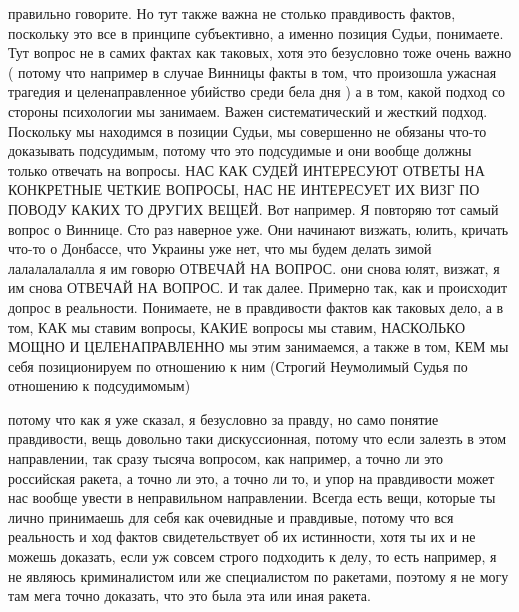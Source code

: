 правильно говорите. Но тут также важна не столько правдивость фактов, поскольку
это все в принципе субъективно, а именно позиция Судьи, понимаете. Тут вопрос
не в самих фактах как таковых, хотя это безусловно тоже очень важно ( потому
что например в случае Винницы факты в том, что произошла ужасная трагедия и
целенаправленное убийство среди бела дня ) а в том, какой подход со стороны
психологии мы занимаем. Важен систематический и жесткий подход. Поскольку мы
находимся в позиции Судьи, мы совершенно не обязаны что-то доказывать
подсудимым, потому что это подсудимые и они вообще должны только отвечать на
вопросы. НАС КАК СУДЕЙ ИНТЕРЕСУЮТ ОТВЕТЫ НА КОНКРЕТНЫЕ ЧЕТКИЕ ВОПРОСЫ, НАС НЕ
ИНТЕРЕСУЕТ ИХ ВИЗГ ПО ПОВОДУ КАКИХ ТО ДРУГИХ ВЕЩЕЙ. Вот например. Я повторяю
тот самый вопрос о Виннице. Сто раз наверное уже. Они начинают визжать, юлить,
кричать что-то о Донбассе, что Украины уже нет, что мы будем делать зимой
лалалалалалла я им говорю ОТВЕЧАЙ НА ВОПРОС. они снова юлят, визжат, я им снова
ОТВЕЧАЙ НА ВОПРОС. И так далее. Примерно так, как и происходит допрос в
реальности. Понимаете, не в правдивости фактов как таковых дело, а в том, КАК
мы ставим вопросы, КАКИЕ вопросы мы ставим, НАСКОЛЬКО МОЩНО И ЦЕЛЕНАПРАВЛЕННО
мы этим занимаемся, а также в том, КЕМ мы себя позиционируем по отношению к ним
(Строгий Неумолимый Судья по отношению к подсудимомым)

потому что как я уже сказал, я безусловно за правду, но само понятие
правдивости, вещь довольно таки дискуссионная, потому что если залезть в этом
направлении, так сразу тысяча вопросом, как например, а точно ли это российская
ракета, а точно ли это, а точно ли то, и упор на правдивости может нас вообще
увести в неправильном направлении. Всегда есть вещи, которые ты лично
принимаешь для себя как очевидные и правдивые, потому что вся реальность и ход
фактов свидетельствует об их истинности, хотя ты их и не можешь доказать, если
уж совсем строго подходить к делу, то есть например, я не являюсь криминалистом
или же специалистом по ракетами, поэтому я не могу там мега точно доказать, что
это была эта или иная ракета.

